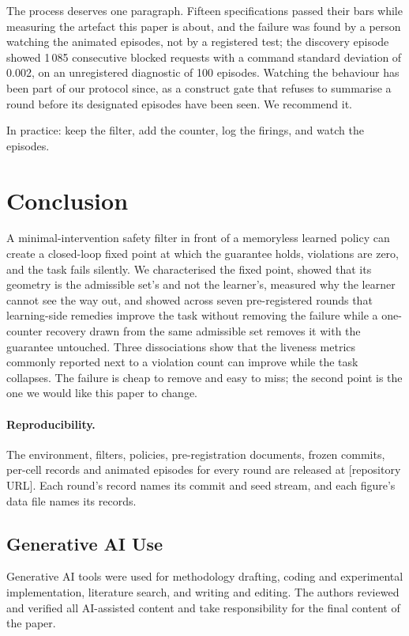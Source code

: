 \documentclass{l4dc2027}
\begin{document}
The process deserves one paragraph. Fifteen specifications passed their bars while measuring the artefact this paper is about, and the failure was found by a person watching the animated episodes, not by a registered test; the discovery episode showed 1\,085 consecutive blocked requests with a command standard deviation of 0.002, on an unregistered diagnostic of 100 episodes. Watching the behaviour has been part of our protocol since, as a construct gate that refuses to summarise a round before its designated episodes have been seen. We recommend it.

In practice: keep the filter, add the counter, log the firings, and watch the episodes.

\section{Conclusion}\label{sec:conclusion}

A minimal-intervention safety filter in front of a memoryless learned policy can create a closed-loop fixed point at which the guarantee holds, violations are zero, and the task fails silently. We characterised the fixed point, showed that its geometry is the admissible set's and not the learner's, measured why the learner cannot see the way out, and showed across seven pre-registered rounds that learning-side remedies improve the task without removing the failure while a one-counter recovery drawn from the same admissible set removes it with the guarantee untouched. Three dissociations show that the liveness metrics commonly reported next to a violation count can improve while the task collapses. The failure is cheap to remove and easy to miss; the second point is the one we would like this paper to change.

\paragraph{Reproducibility.} The environment, filters, policies, pre-registration documents, frozen commits, per-cell records and animated episodes for every round are released at [repository URL]. Each round's record names its commit and seed stream, and each figure's data file names its records.

\subsection*{Generative AI Use}

Generative AI tools were used for methodology drafting, coding and experimental implementation, literature search, and writing and editing. The authors reviewed and verified all AI-assisted content and take responsibility for the final content of the paper.


\end{document}
